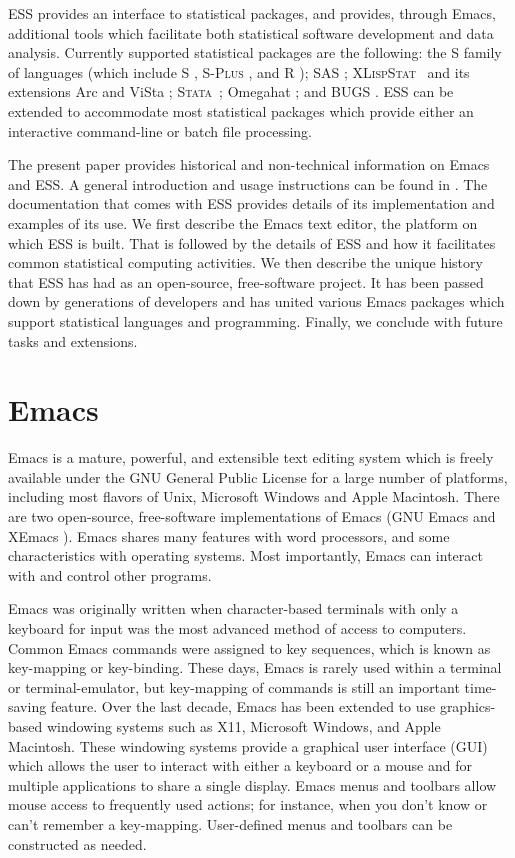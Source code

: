 \documentclass{article}
\newcommand*{\SAS}{\textsc{SAS}{\textregistered} }
\newcommand*{\Splus}{\textsc{S-Plus}}
\newcommand*{\XLispStat}{\textsc{XLispStat}}
\newcommand*{\Stata}{\textsc{Stata}}
\begin{document}
ESS provides an interface to statistical packages, and provides,
through Emacs, additional tools which facilitate both statistical
software development and data analysis.  Currently supported
statistical packages are the following:  the S family of languages (which include
S \citep{BecRCW88,ChaJH92,ChaJ98}, \Splus{} \citep{Splus}, and R
\citep{ihak:gent:1996}); \SAS \citep{SAS:8}; \XLispStat\
\citep{Tier90} and its extensions Arc \citep{Cook:Weisberg:1999} and
ViSta \citep{youn:fald:mcfa:1992}; \Stata\ \citep{Stata:6.0}; Omegahat
\citep{DTLang:2000}; and BUGS \citep{BUGS}.  ESS can be
extended to accommodate most statistical packages which provide either
an interactive command-line or batch file processing.

The present paper provides historical and non-technical information on
Emacs and ESS.  A general introduction and usage instructions can be
found in \cite{heiberger:dsc:2001}.  The documentation that comes with
ESS provides details of its implementation and examples of its use.
We first describe the Emacs text editor, the platform on which ESS is
built.  That is followed by the details of ESS and how it facilitates
common statistical computing activities.  We then describe the unique
history that ESS has had as an open-source, free-software project.
It has been passed down by generations of developers and has
united various Emacs packages which support
statistical languages and programming.  Finally, we conclude with
future tasks and extensions.

\section{Emacs}
\label{sec:emacs}

Emacs is a mature, powerful, and extensible text editing system which
is freely available under the GNU General Public License for a large
number of platforms, including most flavors of Unix, Microsoft Windows
and Apple Macintosh.  There are two open-source, free-software
implementations of Emacs (GNU Emacs \citep{GNU-Emacs} and XEmacs
\citep{XEmacs}).  Emacs shares many features with
word processors, and some characteristics with operating systems.
Most importantly, Emacs can interact with and control other programs.

Emacs was originally written when character-based terminals with only
a keyboard for input was the most advanced method of access to
computers.  Common Emacs commands were assigned to key sequences,
which is known as key-mapping or key-binding.  These days, Emacs is
rarely used within a terminal or terminal-emulator, but key-mapping of
commands is still an important time-saving feature.  Over the last
decade, Emacs has been extended to use graphics-based windowing
systems such as X11, Microsoft Windows, and Apple Macintosh.  These
windowing systems provide a graphical user interface (GUI) which
allows the user to interact with either a keyboard or a mouse and for
multiple applications to share a single display.  Emacs menus and
toolbars allow mouse access to frequently used actions; for instance,
when you don't know or can't remember a key-mapping.  User-defined
menus and toolbars can be constructed as needed.
\end{document}

